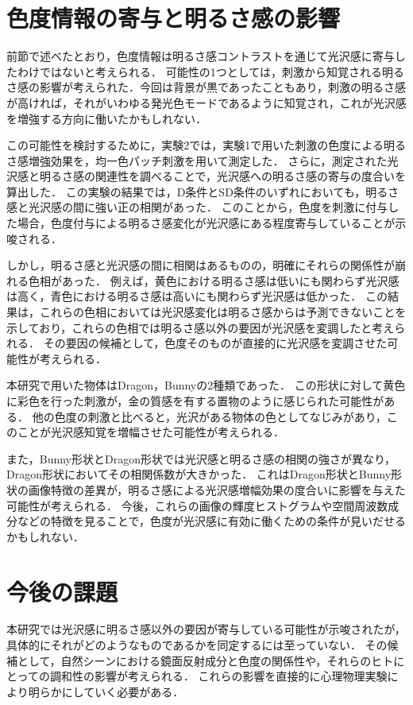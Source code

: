     \section{色度情報の寄与と明るさ感の影響}
        前節で述べたとおり，色度情報は明るさ感コントラストを通じて光沢感に寄与したわけではないと考えられる．
        可能性の1つとしては，刺激から知覚される明るさ感の影響が考えられた．今回は背景が黒であったこともあり，刺激の明るさ感が高ければ，それがいわゆる発光色モード\cite{LightMode}であるように知覚され，これが光沢感を増強する方向に働いたかもしれない．
        
        この可能性を検討するために，実験2では，実験1で用いた刺激の色度による明るさ感増強効果を，均一色パッチ刺激を用いて測定した．
        さらに，測定された光沢感と明るさ感の関連性を調べることで，光沢感への明るさ感の寄与の度合いを算出した．
        この実験の結果では，D条件とSD条件のいずれにおいても，明るさ感と光沢感の間に強い正の相関があった．
        このことから，色度を刺激に付与した場合，色度付与による明るさ感変化が光沢感にある程度寄与していることが示唆される．

        しかし，明るさ感と光沢感の間に相関はあるものの，明確にそれらの関係性が崩れる色相があった．
        例えば，黄色における明るさ感は低いにも関わらず光沢感は高く，青色における明るさ感は高いにも関わらず光沢感は低かった．
        この結果は，これらの色相においては光沢感変化は明るさ感からは予測できないことを示しており，これらの色相では明るさ感以外の要因が光沢感を変調したと考えられる．
        その要因の候補として，色度そのものが直接的に光沢感を変調させた可能性が考えられる．
        
        本研究で用いた物体はDragon，Bunnyの2種類であった．
        この形状に対して黄色に彩色を行った刺激が，金の質感を有する置物のように感じられた可能性がある．
        他の色度の刺激と比べると，光沢がある物体の色としてなじみがあり，このことが光沢感知覚を増幅させた可能性が考えられる．
        
        また，Bunny形状とDragon形状では光沢感と明るさ感の相関の強さが異なり，Dragon形状においてその相関係数が大きかった．
        これはDragon形状とBunny形状の画像特徴の差異が，明るさ感による光沢感増幅効果の度合いに影響を与えた可能性が考えられる．
        今後，これらの画像の輝度ヒストグラムや空間周波数成分などの特徴を見ることで，色度が光沢感に有効に働くための条件が見いだせるかもしれない．

    \section{今後の課題}
        本研究では光沢感に明るさ感以外の要因が寄与している可能性が示唆されたが，具体的にそれがどのようなものであるかを同定するには至っていない．
        その候補として，自然シーンにおける鏡面反射成分と色度の関係性や，それらのヒトにとっての調和性の影響が考えられる．
        これらの影響を直接的に心理物理実験により明らかにしていく必要がある．

